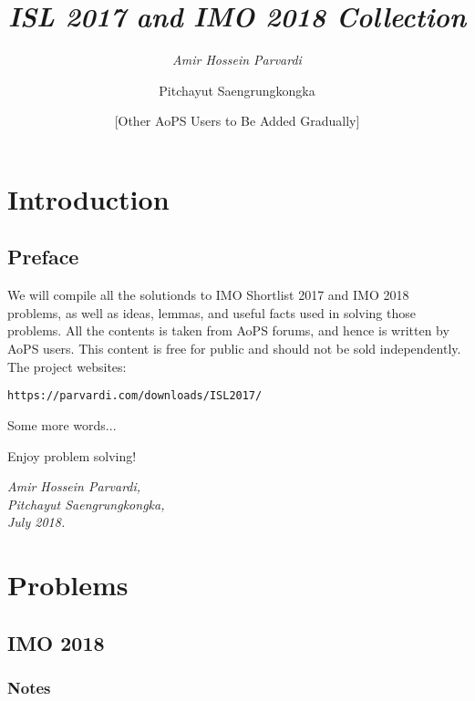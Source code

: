 \documentclass[]{book}
\title{\bfseries \slshape \it ISL 2017 and IMO 2018 Collection}
\author{\it Amir Hossein Parvardi \and
	Pitchayut Saengrungkongka \and 
	[Other AoPS Users to Be Added Gradually]}
\theoremstyle{definition}
\begin{document}
\maketitle

\newpage

\tableofcontents


\frontmatter

\chapter{Introduction}


\newpage


\section*{Preface}
We will compile all the solutionds to IMO Shortlist 2017 and IMO 2018 problems, as well as ideas, lemmas, and useful facts used in solving those problems. All the contents is taken from AoPS forums, and hence is written by AoPS users. This content is free for public and should not be sold independently. The project websites:

\begin{center}
	\texttt{https://parvardi.com/downloads/ISL2017/}
\end{center}

\vspace{0.2cm}
Some more words...


\noindent Enjoy problem solving!

\begin{flushright}
	\sl Amir Hossein Parvardi,\\
	Pitchayut Saengrungkongka,\\
	July 2018.
\end{flushright}

\newpage



\chapter{Problems}

\section{IMO 2018}

\subsection{Notes}

\newpage
\end{document}
